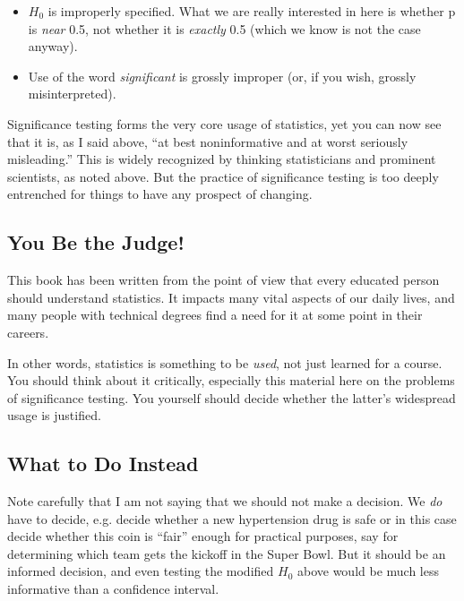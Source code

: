\begin{itemize}

\item $H_0$ is improperly specified.  What we are really interested in
here is whether p is {\it near} 0.5, not whether it is {\it exactly} 0.5
(which we know is not the case anyway).

\item Use of the word {\it significant} is grossly improper (or, if you
wish, grossly misinterpreted).

\end{itemize}

Significance testing forms the very core usage of statistics, yet you
can now see that it is, as I said above, ``at best noninformative and at
worst seriously misleading.'' This is widely recognized by thinking
statisticians and prominent scientists, as noted above.  But the
practice of significance testing is too deeply entrenched for things to
have any prospect of changing.

\subsection{You Be the Judge!}

This book has been written from the point of view that every educated
person should understand statistics.  It impacts many vital aspects of
our daily lives, and many people with technical degrees find a need for
it at some point in their careers.  

In other words, statistics is something to be {\it used}, not just
learned for a course.  You should think about it critically, especially
this material here on the problems of significance testing.  You
yourself should decide whether the latter's widespread usage is
justified.

\subsection{What to Do Instead}

Note carefully that I am not saying that we should not make a decision.
We {\it do} have to decide, e.g. decide whether a new hypertension drug
is safe or in this case decide whether this coin is ``fair'' enough for
practical purposes, say for determining which team gets the kickoff in
the Super Bowl.  But it should be an informed decision, and even testing
the modified $H_0$ above would be much less informative than a
confidence interval.

